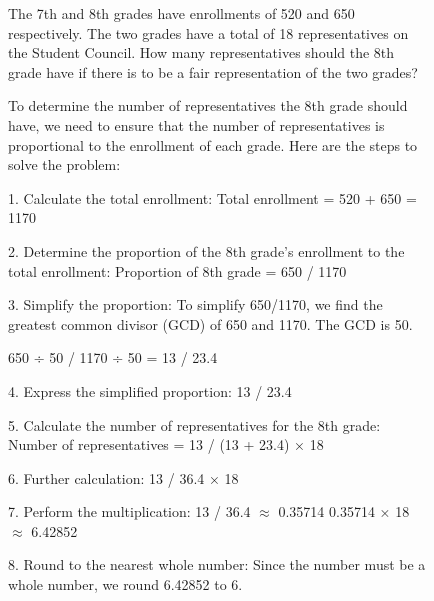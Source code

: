 \documentclass{article}
\begin{document}
\begin{figure}[h]
\centering
  
\begin{tcolorbox}[
    colback=gray!5!white, 
    colframe=brown!75!brown, 
    title=Case-1 from MATH,
    boxrule=0.3mm, 
    width=\linewidth,  
    arc=2mm, 
    auto outer arc=true
]
The 7th and 8th grades have enrollments of 520 and 650 respectively. The two grades have a total of 18 representatives on the Student Council. How many representatives should the 8th grade have if there is to be a fair representation of the two grades?
\end{tcolorbox}

\vspace{0.2cm}   
 
\begin{minipage}[t]{0.48\linewidth} 
    \begin{tcolorbox}[
        colback=gray!5!white, 
        colframe=red!75!brown, 
        title=Wrong Rollout, 
        boxrule=0.3mm, 
        width=\linewidth, 
        arc=2mm, 
        height=18cm,
        auto outer arc=true,
        top=2mm, bottom=2mm, left=2mm, right=2mm 
    ]
To determine the number of representatives the 8th grade should have, we need 
to ensure that the number of representatives is proportional to the enrollment 
of each grade. Here are the steps to solve the problem:

1. Calculate the total enrollment:
   Total enrollment = 520 + 650 = 1170

2. Determine the proportion of the 8th grade's enrollment to the total enrollment:
   Proportion of 8th grade = 650 / 1170

3. Simplify the proportion:
   To simplify 650/1170, we find the greatest common divisor (GCD) of 650 and 
   1170. The GCD is 50.
   
   650 ÷ 50 / 1170 ÷ 50 = 13 / 23.4   

4. Express the simplified proportion:
   13 / 23.4

5. Calculate the number of representatives for the 8th grade:
   Number of representatives = 13 / (13 + 23.4) × 18

6. Further calculation:
   13 / 36.4 × 18

7. Perform the multiplication:
   13 / 36.4 $\approx$ 0.35714
   0.35714 × 18 $\approx$ 6.42852

8. Round to the nearest whole number:
   Since the number must be a whole number, we round 6.42852 to 6.


\end{tcolorbox}
\end{minipage}
\end{figure}
\end{document}
